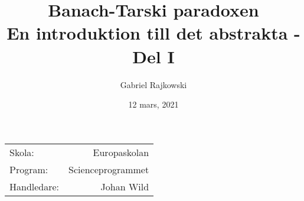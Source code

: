 \documentclass{article}
\theoremstyle{definition}
\begin{document}
\begin{figure}
  \begin{center}
    \newcommand{\mydistance}{.6cm}
    \vspace{4cm}
  \end{center}  
\end{figure}

\title{%
  Banach-Tarski paradoxen \\
  \small{En introduktion till det abstrakta - Del I}
}
\author{Gabriel Rajkowski}
\date{12 mars, 2021}
\maketitle
\begin{center}
  \begin{tabular}{l r}
  Skola: & Europaskolan \\ 
  Program: & Scienceprogrammet \\ 
  Handledare: & Johan Wild
  \end{tabular}
\end{center}

\maketitle

\thispagestyle{empty}

\clearpage
\tableofcontents
\end{document}
